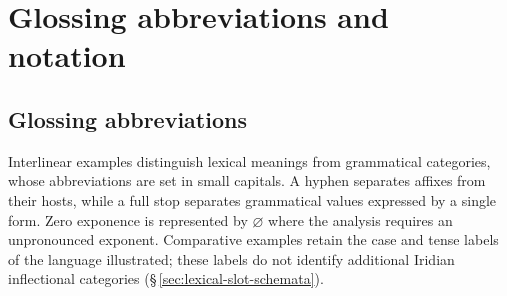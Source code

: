 \chapter{Glossing abbreviations and notation}\label{app:abbreviations}

\section{Glossing abbreviations}
Interlinear examples distinguish lexical meanings from grammatical categories,
whose abbreviations are set in small capitals. A hyphen separates affixes from
their hosts, while a full stop separates grammatical values expressed by a
single form. Zero exponence is represented by $\varnothing$ where the analysis
requires an unpronounced exponent. Comparative examples retain the
case and tense labels of the language illustrated; these labels do not
identify additional Iridian inflectional categories
(§\,\ref{sec:lexical-slot-schemata}).

